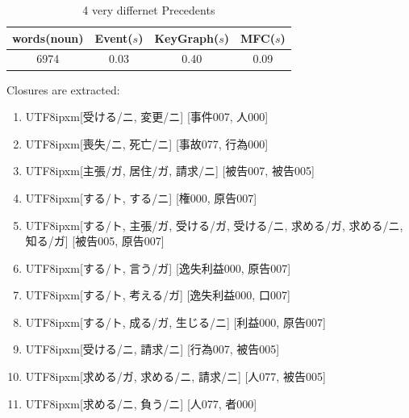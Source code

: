 \begin{table}[!h]
\centering
\begin{tabular}{cccc}
\hline
words(noun)&Event($s$)&KeyGraph($s$)&MFC($s$)\\
\hline
6974&0.03&0.40&0.09\\
\hline
\end{tabular}
\caption{4 very differnet Precedents}
\end{table}
Closures are extracted:
\begin{enumerate}
\item \begin{CJK}{UTF8}{ipxm}[受ける/ニ, 変更/ニ] [事件007, 人000]\end{CJK}
\item \begin{CJK}{UTF8}{ipxm}[喪失/ニ, 死亡/ニ] [事故077, 行為000]\end{CJK}
\item \begin{CJK}{UTF8}{ipxm}[主張/ガ, 居住/ガ, 請求/ニ] [被告007, 被告005]\end{CJK}
\item \begin{CJK}{UTF8}{ipxm}[する/ト, する/ニ] [権000, 原告007]\end{CJK}
\item \begin{CJK}{UTF8}{ipxm}[する/ト, 主張/ガ, 受ける/ガ, 受ける/ニ, 求める/ガ, 求める/ニ, 知る/ガ] [被告005, 原告007]\end{CJK}
\item \begin{CJK}{UTF8}{ipxm}[する/ト, 言う/ガ] [逸失利益000, 原告007]\end{CJK}
\item \begin{CJK}{UTF8}{ipxm}[する/ト, 考える/ガ] [逸失利益000, 口007]\end{CJK}
\item \begin{CJK}{UTF8}{ipxm}[する/ト, 成る/ガ, 生じる/ニ] [利益000, 原告007]\end{CJK}
\item \begin{CJK}{UTF8}{ipxm}[受ける/ニ, 請求/ニ] [行為007, 被告005]\end{CJK}
\item \begin{CJK}{UTF8}{ipxm}[求める/ガ, 求める/ニ, 請求/ニ] [人077, 被告005]\end{CJK}
\item \begin{CJK}{UTF8}{ipxm}[求める/ニ, 負う/ニ] [人077, 者000]\end{CJK}

\end{enumerate}
